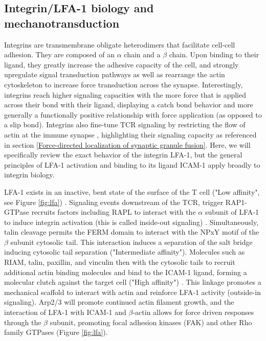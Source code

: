 \subsection{Integrin/LFA-1 biology and mechanotransduction}
\label{Integrin biology and mechanotransduction}
Integrins are transmembrane obligate heterodimers that facilitate cell-cell adhesion. They are composed of an $\alpha$ chain and a $\beta$ chain. Upon  binding to their ligand, they greatly increase the adhesive capacity of the cell, and strongly upregulate signal transduction pathways as well as rearrange the actin cytoskeleton to increase force transduction across the synapse. Interestingly, integrins reach higher signaling capacities with the more force that is applied across their bond with their ligand, displaying a catch bond behavior \cite{Chen2010} and more generally a functionally positive relationship with force application (as opposed to a slip bond). Integrins also fine-tune TCR signaling by restricting the flow of actin at the immune synapse \cite{Jankowska2018}, highlighting their signaling capacity as referenced in section \ref{Force-directed localization of synaptic granule fusion}. Here, we will specifically review the exact behavior of the integrin LFA-1, but the general principles of LFA-1 activation and binding to its ligand ICAM-1 apply broadly to integrin biology.

LFA-1 exists in an inactive, bent state of the surface of the T cell ("Low affinity", see Figure \ref{fig:lfa}) \cite{Comrie2015_2}. Signaling events downstream of the TCR, trigger RAP1-GTPase recruits factors including RAPL to interact with the $\alpha$ subunit of LFA-1 to induce integrin activation (this is called inside-out signaling) \cite{Walling2018}. Simultaneously, talin cleavage permits the FERM domain to interact with the NPxY motif of the $\beta$ subunit cytosolic tail. This interaction induces a separation of the salt bridge inducing cytosolic tail separation ("Intermediate affinity"). Molecules such as RIAM, talin, paxillin, and vinculin then with the cytosolic tails to recruit additional actin binding molecules and bind to the ICAM-1 ligand, forming a molecular clutch against the target cell ("High affinity") \cite{Comrie2015_2}. This linkage promotes a mechanical scaffold to interact with actin and reinforce LFA-1 activity (outside-in signaling). Arp2/3 will promote continued actin filament growth, and the interaction of LFA-1 with ICAM-1 and $\beta$-actin allows for force driven responses through the $\beta$ subunit, promoting focal adhesion kinases (FAK) and other Rho family GTPases (Figure \ref{fig:lfa}).

